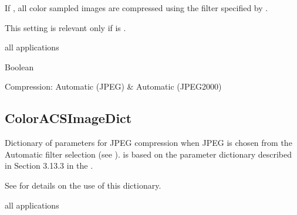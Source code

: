 \documentclass[letterpaper,12pt,english,openany,oneside]{sphinxmanual}
\begin{document}
If  , all color sampled images are compressed using the filter specified by  .

This setting is relevant only if  is  .

\label{\detokenize{PDF_Create_CommonSettings:supported-by-18}}

all applications

\label{\detokenize{PDF_Create_CommonSettings:type-18}}

Boolean

\label{\detokenize{PDF_Create_CommonSettings:ui-name-13}}

Compression: Automatic (JPEG) \& Automatic (JPEG2000)

\label{\detokenize{PDF_Create_CommonSettings:default-value-15}}

\begin{sphinxVerbatim}[commandchars=\\\{\}]
\end{sphinxVerbatim}




\subsection{ColorACSImageDict}
\label{\detokenize{PDF_Create_CommonSettings:coloracsimagedict}}
Dictionary of parameters for JPEG compression when JPEG is chosen from the Automatic filter selection (see ).  is based on the  parameter dictionary described in Section 3.13.3 in the  .

See  for details on the use of this dictionary.

\label{\detokenize{PDF_Create_CommonSettings:supported-by-19}}

all applications

\label{\detokenize{PDF_Create_CommonSettings:type-19}}
\end{document}
